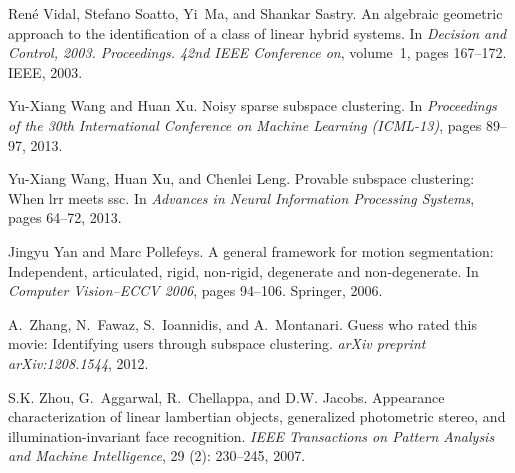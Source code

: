 \documentclass{ctexart}
\begin{document}
\begin{thebibliography}{47}
    Ren{\'e} Vidal, Stefano Soatto, Yi~Ma, and Shankar Sastry.
    \newblock An algebraic geometric approach to the identification of a class of
    linear hybrid systems.
    \newblock In \emph{Decision and Control, 2003. Proceedings. 42nd IEEE
    Conference on}, volume~1, pages 167--172. IEEE, 2003.

    Yu-Xiang Wang and Huan Xu.
    \newblock Noisy sparse subspace clustering.
    \newblock In \emph{Proceedings of the 30th International Conference on Machine
    Learning (ICML-13)}, pages 89--97, 2013.

    Yu-Xiang Wang, Huan Xu, and Chenlei Leng.
    \newblock Provable subspace clustering: When lrr meets ssc.
    \newblock In \emph{Advances in Neural Information Processing Systems}, pages
    64--72, 2013.

    Jingyu Yan and Marc Pollefeys.
    \newblock A general framework for motion segmentation: Independent,
    articulated, rigid, non-rigid, degenerate and non-degenerate.
    \newblock In \emph{Computer Vision--ECCV 2006}, pages 94--106. Springer, 2006.

    A.~Zhang, N.~Fawaz, S.~Ioannidis, and A.~Montanari.
    \newblock Guess who rated this movie: Identifying users through subspace
    clustering.
    \newblock \emph{arXiv preprint arXiv:1208.1544}, 2012.

    S.K. Zhou, G.~Aggarwal, R.~Chellappa, and D.W. Jacobs.
    \newblock Appearance characterization of linear lambertian objects, generalized
    photometric stereo, and illumination-invariant face recognition.
    \newblock \emph{IEEE Transactions on Pattern Analysis and Machine
    Intelligence}, 29 (2): 230--245, 2007.

\end{thebibliography}
\end{document}
